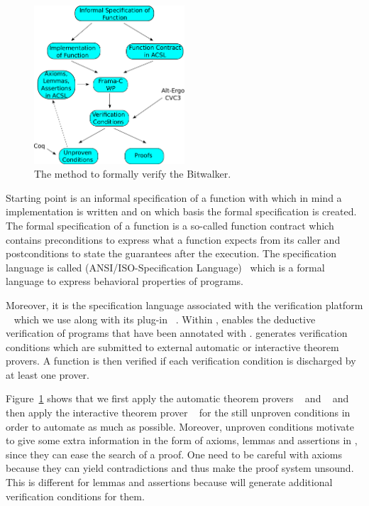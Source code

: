 \begin{figure}
\centering
\includegraphics[width=0.50\textwidth]{figures/method-bitwalker.pdf}
\caption{\label{fig:method} The method to formally verify the Bitwalker.}
\end{figure}

Starting point is an informal specification of a function with which in mind
a implementation is written and on which basis the formal specification is created.
The formal specification of a function is a so-called function contract
which contains preconditions to express what a function expects from its caller
and postconditions to state the guarantees after the execution.
The specification language is called 
\acsl (ANSI\slash ISO-\isoc Specification Language)~\cite{acsl} 
which is a formal language to express behavioral properties of \isoc programs.

Moreover, it is the specification language associated with 
the verification platform \framac~\cite{FramaC}
which we use along with its plug-in \wpframac~\cite{wp}.
Within \framac, \wpframac enables the deductive verification of
\isoc programs that have been annotated with \acsl.
\wpframac generates verification conditions which are submitted to external 
automatic or interactive theorem provers.
A function is then verified if each verification condition is discharged
by at least one prover.

Figure~\ref{fig:method} shows that we first apply the automatic
theorem provers \altergo~\cite{alt-ergo} and \cvc~\cite{cvc3}
and then apply the
interactive theorem prover \coq~\cite{Coq}
for the still unproven conditions in order to automate as much as possible.
Moreover, unproven conditions motivate to give some extra information
in the form of axioms, lemmas and assertions in \acsl, 
since they can ease the search of a proof.
One need to be careful with axioms because they can yield contradictions
and thus make the proof system unsound.
This is different for lemmas and assertions
because \wpframac will generate additional verification conditions for them.

